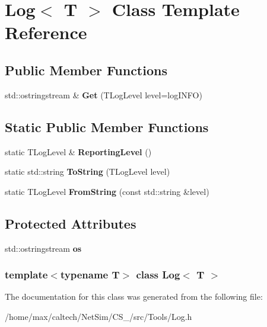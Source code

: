 \hypertarget{classLog}{\section{\-Log$<$ \-T $>$ \-Class \-Template \-Reference}
\label{classLog}
}
\subsection*{\-Public \-Member \-Functions}
\begin{DoxyCompactItemize}
\item 
\hypertarget{classLog_af1e91af54d9f85caaa661f794b37bffb}{std\-::ostringstream \& {\bfseries \-Get} (\-T\-Log\-Level level=log\-I\-N\-F\-O)}\label{classLog_af1e91af54d9f85caaa661f794b37bffb}

\end{DoxyCompactItemize}
\subsection*{\-Static \-Public \-Member \-Functions}
\begin{DoxyCompactItemize}
\item 
\hypertarget{classLog_a7e74a1454fd3d52a408eaa1c04ab4d23}{static \-T\-Log\-Level \& {\bfseries \-Reporting\-Level} ()}\label{classLog_a7e74a1454fd3d52a408eaa1c04ab4d23}

\item 
\hypertarget{classLog_aa889a30fd8ee83904e193ec5e9446216}{static std\-::string {\bfseries \-To\-String} (\-T\-Log\-Level level)}\label{classLog_aa889a30fd8ee83904e193ec5e9446216}

\item 
\hypertarget{classLog_a684966272ade00c32c6e9744eb6b3e9c}{static \-T\-Log\-Level {\bfseries \-From\-String} (const std\-::string \&level)}\label{classLog_a684966272ade00c32c6e9744eb6b3e9c}

\end{DoxyCompactItemize}
\subsection*{\-Protected \-Attributes}
\begin{DoxyCompactItemize}
\item 
\hypertarget{classLog_a01de1c92999fe0c55e5b4a50ffe02336}{std\-::ostringstream {\bfseries os}}\label{classLog_a01de1c92999fe0c55e5b4a50ffe02336}

\end{DoxyCompactItemize}
\subsubsection*{template$<$typename \-T$>$ class Log$<$ T $>$}



\-The documentation for this class was generated from the following file\-:\begin{DoxyCompactItemize}
\item 
/home/max/caltech/\-Net\-Sim/\-C\-S\-\_/src/\-Tools/\-Log.\-h\end{DoxyCompactItemize}
